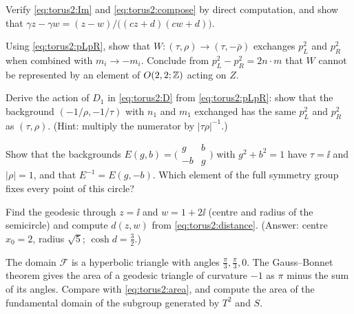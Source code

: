 \begin{exercise}[$\star$]
Verify \eqref{eq:torus2:Im} and \eqref{eq:torus2:compose} by direct computation, and show that
$\gamma z-\gamma w=(z-w)/\big((cz+d)(cw+d)\big)$.
\end{exercise}

\begin{exercise}[$\star\star$]
Using \eqref{eq:torus2:pLpR}, show that $W:(\tau,\rho)\to(\tau,-\bar\rho)$ exchanges
$p_L^2$ and $p_R^2$ when combined with $m_i\to-m_i$. Conclude from $p_L^2-p_R^2=2n\cdot m$
that $W$ cannot be represented by an element of $O(2,2;\mathbb{Z})$ acting on $Z$.
\end{exercise}

\begin{exercise}[$\star\star$]
Derive the action of $D_1$ in \eqref{eq:torus2:D} from \eqref{eq:torus2:pLpR}: show that
the background $(-1/\rho,-1/\tau)$ with $n_1$ and $m_1$ exchanged has the same $p_L^2$ and
$p_R^2$ as $(\tau,\rho)$. (Hint: multiply the numerator by $|\tau\rho|^{-1}$.)
\end{exercise}

\begin{exercise}[$\star\star$]
Show that the backgrounds $E(g,b)=\big(\begin{smallmatrix}g&b\\-b&g\end{smallmatrix}\big)$
with $g^2+b^2=1$ have $\tau=\ii$ and $|\rho|=1$, and that $E^{-1}=E(g,-b)$. Which element of
the full symmetry group fixes every point of this circle?
\end{exercise}

\begin{exercise}[$\star\star$]
Find the geodesic through $z=\ii$ and $w=1+2\ii$ (centre and radius of the semicircle) and
compute $d(z,w)$ from \eqref{eq:torus2:distance}. (Answer: centre $x_0=2$, radius
$\sqrt5$; $\cosh d=\frac32$.)
\end{exercise}

\begin{exercise}[$\star\star\star$]
The domain $\mathcal F$ is a hyperbolic triangle with angles $\frac\pi3,\frac\pi3,0$. The
Gauss--Bonnet theorem gives the area of a geodesic triangle of curvature $-1$ as $\pi$ minus
the sum of its angles. Compare with \eqref{eq:torus2:area}, and compute the area of the
fundamental domain of the subgroup generated by $T^2$ and $S$.
\end{exercise}

